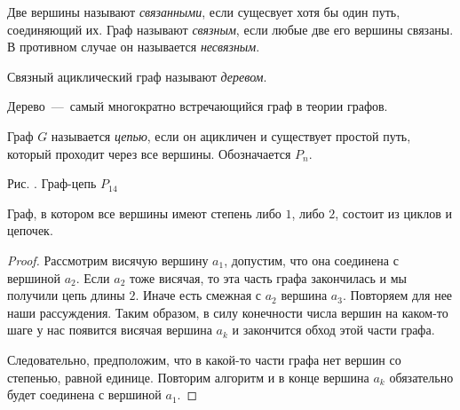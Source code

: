 \begin{definition}
	Две вершины называют \emph{связанными}, если сущесвует хотя бы один путь, соединяющий их. Граф называют \emph{связным}, если любые две его вершины связаны. В противном случае он называется \emph{несвязным}.
\end{definition}

\begin{definition}
	Связный ациклический граф называют \emph{деревом}.
\end{definition}

	Дерево~---~самый многократно встречающийся граф в теории графов. 
	
\begin{definition}
	Граф $G$ называется \emph{цепью}, если он ацикличен и существует простой путь, который проходит через все вершины. Обозначается $P_n$.
\end{definition}

\begin{center}
\newline
\newline
	\small Рис. \images. Граф-цепь $P_{14}$
\end{center}

\begin{statement}
	Граф, в котором все вершины имеют степень либо $1$, либо $2$, состоит из циклов и цепочек.

\begin{proof}
	Рассмотрим висячую вершину $a_1$, допустим, что она соединена с вершиной $a_2$. Если $a_2$ тоже висячая, то эта часть графа закончилась и мы получили цепь длины $2$. Иначе есть смежная с $a_2$ вершина $a_3$. Повторяем для нее наши рассуждения. Таким образом, в силу конечности числа вершин на каком-то шаге у нас появится висячая вершина $a_k$ и закончится обход этой части графа.
	
	 Следовательно, предположим, что в какой-то части графа нет вершин со степенью, равной единице. Повторим алгоритм и в конце вершина $a_k$ обязательно будет соединена с вершиной $a_1$.
\end{proof}
\end{statement}

